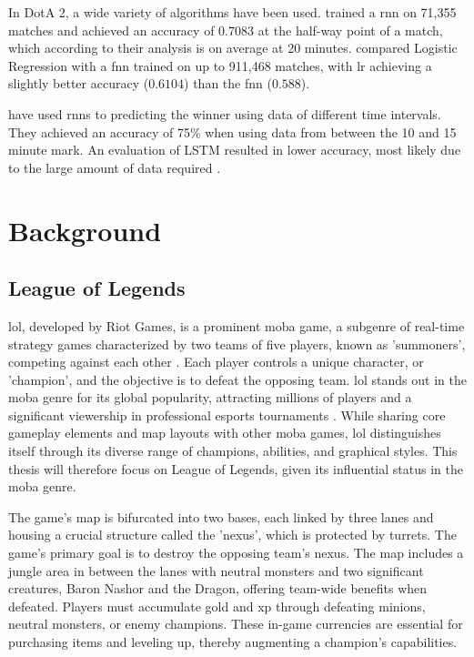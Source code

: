 \documentclass[12pt, a4paper, headinclude, twoside, plainheadsepline, open=right, numbers=noenddot, hidelinks, toc=listof, toc=bibliography]{scrreprt}
\begin{document}
In DotA 2, a wide variety of algorithms have been used.  
 \cite{yuMOBASliceTimeSlice2018} trained a \ac{rnn} on 71,355 matches and achieved an accuracy of $0.7083$ at the half-way point of a match, which according to their analysis is on average at 20 minutes.
 \cite{wangPredictingMultiplayerOnline2016} compared Logistic Regression with a \ac{fnn} trained on up to 911,468 matches, with \ac{lr} achieving a slightly better accuracy ($0.6104$) than the \ac{fnn} ($0.588$).


 have used \acp{rnn} to predicting the winner using data of different time intervals. They achieved an accuracy of 75\% when using data from between the 10 and 15 minute mark.
An evaluation of LSTM resulted in lower accuracy, most likely due to the large amount of data required \cite{silvaContinuousOutcomePrediction2018}.

\chapter{Background}
\label{chap:background}

\section{League of Legends}
\label{sec:LoL}

\ac{lol}, developed by Riot Games, is a prominent \ac{moba} game, a subgenre of real-time strategy games characterized by two teams of five players, known as 'summoners', competing against each other \cite{mora-cantallopsMOBAGamesLiterature2018}. 
Each player controls a unique character, or 'champion', and the objective is to defeat the opposing team. 
\Ac{lol} stands out in the \ac{moba} genre for its global popularity, attracting millions of players and a significant viewership in professional esports tournaments \cite{goughLeagueLegendsChampionships}.
While sharing core gameplay elements and map layouts with other \ac{moba} games, \ac{lol} distinguishes itself through its diverse range of champions, abilities, and graphical styles. 
This thesis will therefore focus on League of Legends, given its influential status in the \ac{moba} genre. 

The game's map is bifurcated into two bases, each linked by three lanes and housing a crucial structure called the 'nexus', which is protected by turrets. 
The game's primary goal is to destroy the opposing team's nexus.
The map includes a jungle area in between the lanes with neutral monsters and two significant creatures, Baron Nashor and the Dragon, offering team-wide benefits when defeated.
Players must accumulate gold and \ac{xp} through defeating minions, neutral monsters, or enemy champions. 
These in-game currencies are essential for purchasing items and leveling up, thereby augmenting a champion's capabilities.
\end{document}
